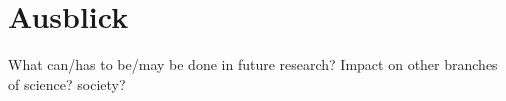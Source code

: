\section{Ausblick}

What can/has to be/may be done in future research? Impact on other branches of science? society?